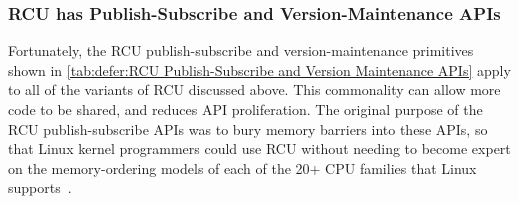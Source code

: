 \subsubsection{RCU has Publish-Subscribe and Version-Maintenance APIs}
\label{sec:defer:RCU has Publish-Subscribe and Version-Maintenance APIs}

Fortunately, the RCU publish-subscribe and version-maintenance
primitives shown in
\cref{tab:defer:RCU Publish-Subscribe and Version Maintenance APIs}
apply to all of the variants of RCU discussed above.
This commonality can allow more code to be shared, and reduces API
proliferation.
The original purpose of the RCU publish-subscribe APIs was to
bury memory barriers into these APIs, so that Linux kernel
programmers could use RCU without needing to become expert on
the memory-ordering models of each of the 20+ CPU families
that Linux supports~\cite{Spraul01}.

\begin{table}
\renewcommand*{\arraystretch}{1.15}
\footnotesize
\centering\OneColumnHSpace{-.4in}
\caption{RCU Publish-Subscribe and Version Maintenance APIs}
\label{tab:defer:RCU Publish-Subscribe and Version Maintenance APIs}
\end{table}

